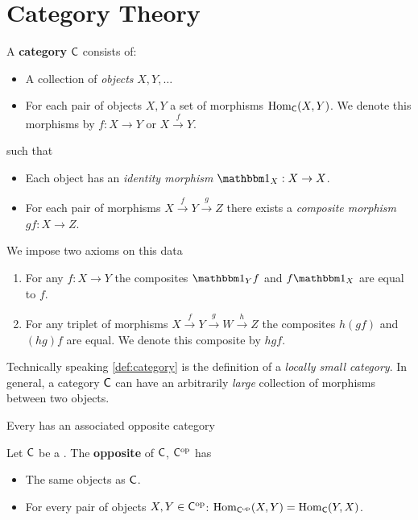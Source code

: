 \documentclass[../main.tex]{subfiles}
\begin{document}
\chapter{Category Theory}
\begin{definition}[Category] \label{def:category}
  A \textbf{category} \(\mathsf{C}\) consists of:
  \begin{itemize}
    \item A collection of \textit{objects} \(X, Y, \ldots\)
    \item For each pair of objects \(X, Y\) a set of morphisms \(\operatorname{Hom}_{\mathsf{C}}(X, Y)\).
          We denote this morphisms by \(f: X \to Y\) or \(X \xrightarrow{f} Y\).
  \end{itemize}
  such that
  \begin{itemize}
    \item Each object has an \textit{identity morphism} \(\id_{X}: X \to X\).
    \item For each pair of morphisms \(X \xrightarrow{f} Y \xrightarrow{g} Z\) there exists a \textit{composite morphism} \(gf: X \to Z\).
  \end{itemize}

  We impose two axioms on this data
  \begin{enumerate}
    \item For any \(f: X \to Y\) the composites \(\id_{Y}f\) and \(f\id_{X}\) are equal to \(f\).
    \item For any triplet of morphisms \(X \xrightarrow{f} Y \xrightarrow{g} W \xrightarrow{h} Z\) the composites \(h(gf)\) and \((hg)f\) are equal.
          We denote this composite by \(hgf\).
  \end{enumerate}
\end{definition}

\begin{remark}
  Technically speaking \autoref{def:category} is the definition of a \textit{locally small category}.
  In general, a category \(\mathsf{C}\) can have an arbitrarily \textit{large} collection of morphisms between two objects.
\end{remark}

Every  has an associated opposite category
\begin{definition} \label{def:opposite-category}
  Let \(\mathsf{C}\) be a .
  The \textbf{opposite } of \(\mathsf{C}\), \(\mathsf{C}^{\operatorname*{op}}\) has
  \begin{itemize}
    \item The same objects as \(\mathsf{C}\).
    \item For every pair of objects \(X, Y \in \mathsf{C}^{\operatorname*{op}}\): \(\operatorname{Hom}_{\mathsf{C}^{\operatorname*{op}}}(X, Y) = \operatorname{Hom}_{\mathsf{C}}(Y, X)\).
  \end{itemize}
\end{definition}
\end{document}
